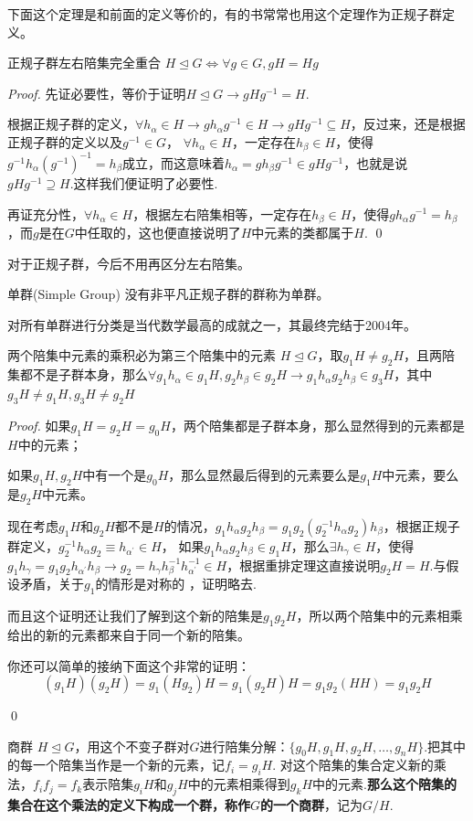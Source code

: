 下面这个定理是和前面的定义等价的，有的书常常也用这个定理作为正规子群定义。
\begin{theorem}{正规子群左右陪集完全重合}
    $H\unlhd G\iff \forall g\in G,gH=Hg$
\end{theorem}
\begin{proof}
    先证必要性，等价于证明$H\unlhd G\rightarrow gHg^{-1}=H$.

    根据正规子群的定义，$\forall h_\alpha\in H\rightarrow gh_\alpha g^{-1}\in H\rightarrow gHg^{-1}\subseteq H$，反过来，还是根据正规子群的定义以及$g^{-1}\in G$，
    $\forall h_\alpha\in H$，一定存在$h_\beta\in H$，使得$g^{-1}h_\alpha (g^{-1})^{-1}=h_\beta$成立，而这意味着$h_\alpha=g h_\beta g^{-1}\in gHg^{-1}$，也就是说$gHg^{-1}\supseteq H$.这样我们便证明了必要性.

    再证充分性，$\forall h_\alpha\in H$，根据左右陪集相等，一定存在$h_\beta\in H$，使得$gh_\alpha g^{-1}=h_\beta$，而$g$是在$G$中任取的，这也便直接说明了$H$中元素的类都属于$H$.
    \qed
\end{proof}
对于正规子群，今后不用再区分左右陪集。
\begin{define}{单群(Simple Group)}
	没有非平凡正规子群的群称为单群。
\end{define}
对所有单群进行分类是当代数学最高的成就之一，其最终完结于2004年。
\begin{theorem}{两个陪集中元素的乘积必为第三个陪集中的元素}
    $H\unlhd G$，取$g_1H\neq g_2H$，且两陪集都不是子群本身，那么$\forall g_1h_\alpha\in g_1H,g_2h_\beta\in g_2H\rightarrow g_1h_\alpha g_2h_\beta\in g_3H$，其中$g_3H\neq g_1H,g_3H\neq g_2H$
\end{theorem}
\begin{proof}
    如果$g_1H=g_2H=g_0H$，两个陪集都是子群本身，那么显然得到的元素都是$H$中的元素；

    如果$g_1H,g_2H$中有一个是$g_0H$，那么显然最后得到的元素要么是$g_1H$中元素，要么是$g_2H$中元素。

    现在考虑$g_1H$和$g_2H$都不是$H$的情况，$g_1h_\alpha g_2 h_\beta=g_1g_2(g_2^{-1}h_\alpha g_2 )h_\beta$，根据正规子群定义，$g_2^{-1}h_\alpha g_2\equiv h_{\alpha^\prime}\in H$，
    如果$g_1h_{\alpha} g_2 h_\beta\in g_1H$，那么$\exists h_\gamma\in H$，使得$g_1h_\gamma=g_1g_2h_{\alpha^\prime} h_\beta\rightarrow g_2=h_\gamma h_\beta^{-1} h_{\alpha^\prime}^{-1}\in H$，根据重排定理这直接说明$g_2 H=H$.与假设矛盾，关于$g_1$的情形是对称的
    ，证明略去. 

    而且这个证明还让我们了解到这个新的陪集是$g_1g_2H$，所以两个陪集中的元素相乘给出的新的元素都来自于同一个新的陪集。
    
    你还可以简单的接纳下面这个非常的证明：\[(g_1H)(g_2H)=g_1(Hg_2)H=g_1(g_2H)H=g_1g_2(HH)=g_1g_2H\]
    
    \qed
\end{proof}
\begin{define}{商群}
    $H\unlhd G$，用这个不变子群对$G$进行陪集分解：$\{g_0H,g_1H,g_2H,\ldots,g_nH\}$.把其中的每一个陪集当作是一个新的元素，记$f_i=g_iH$.
    对这个陪集的集合定义新的乘法，$f_if_j=f_k$表示陪集$g_iH$和$g_jH$中的元素相乘得到$g_kH$中的元素.\textbf{那么这个陪集的集合在这个乘法的定义下构成一个群，称作$G$的一个商群}，记为$G/H$.
\end{define}

